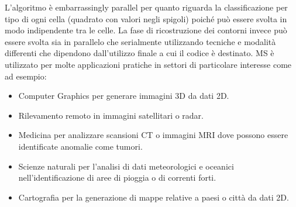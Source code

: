 \documentclass[12pt,a4paper]{report}
\begin{document}
L'algoritmo è embarrassingly parallel per quanto riguarda la classificazione per tipo di ogni cella (quadrato con valori negli spigoli) poiché può essere svolta in modo indipendente tra le celle. \newline
La fase di ricostruzione dei contorni invece può essere svolta sia in parallelo che serialmente utilizzando tecniche e modalità differenti che dipendono dall'utilizzo finale a cui il codice è destinato. \newline
MS è utilizzato per molte applicazioni pratiche in settori di particolare interesse come ad esempio:
\begin{itemize}
\item Computer Graphics per generare immagini 3D da dati 2D.
\item Rilevamento remoto in immagini satellitari o radar.
\item Medicina per analizzare scansioni CT o immagini MRI dove possono essere identificate anomalie come tumori.
\item Scienze naturali per l'analisi di dati meteorologici e oceanici nell'identificazione di aree di pioggia o di correnti forti.
\item Cartografia per la generazione di mappe relative a paesi o città da dati 2D.
\end{itemize}
\end{document}
